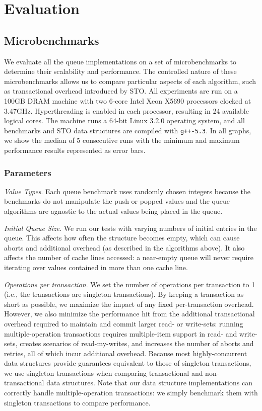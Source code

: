 \section{Evaluation}

\subsection{Microbenchmarks}
\label{q_microbenchmarks}

We evaluate all the queue implementations on a set of microbenchmarks to determine their scalability and performance. The controlled nature of these microbenchmarks allows us to compare particular aspects of each algorithm, such as transactional overhead introduced by STO. All experiments are run on a 100GB DRAM machine with two 6-core Intel Xeon X5690 processors clocked at 3.47GHz. Hyperthreading is enabled in each processor, resulting in 24 available logical cores. The machine runs a 64-bit Linux 3.2.0 operating system, and all benchmarks and STO data structures are compiled with \texttt{g++-5.3}. In all graphs, we show the median of 5 consecutive runs with the minimum and maximum performance results represented as error bars.

\subsubsection{Parameters}

\emph{Value Types}. Each queue benchmark uses randomly chosen integers because the benchmarks do not manipulate the push or popped values and the queue algorithms are agnostic to the actual values being placed in the queue.

\emph{Initial Queue Size}. We run our tests with varying numbers of initial entries in the queue. This affects how often the structure becomes empty, which can cause aborts and additional overhead (as described in the algorithms above). It also affects the number of cache lines accessed: a near-empty queue will never require iterating over values contained in more than one cache line.

\emph{Operations per transaction}. We set the number of operations per transaction to 1 (i.e., the transactions are singleton transactions). By keeping a transaction as short as possible, we maximize the impact of any fixed per-transaction overhead. However, we also minimize the performance hit from the additional transactional overhead required to maintain and commit larger read- or write-sets: running multiple-operation transactions requires multiple-item support in read- and write-sets, creates scenarios of read-my-writes, and increases the number of aborts and retries, all of which incur additional overhead. 
Because most highly-concurrent data structures provide guarantees equivalent to those of singleton transactions, we use singleton transactions when comparing transactional and non-transactional data structures.
Note that our data structure implementations can correctly handle multiple-operation transactions: we simply benchmark them with singleton transactions to compare performance.

